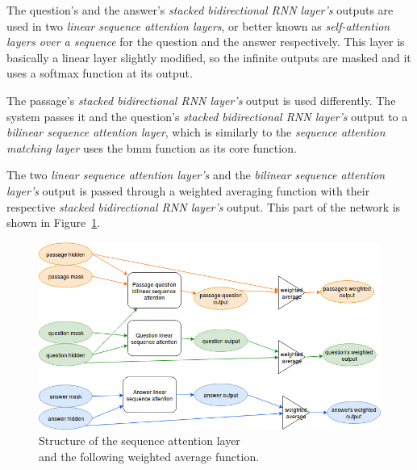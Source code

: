 The question's and the answer's \textit{stacked bidirectional RNN layer's} outputs are used in two \textit{linear sequence attention layers}, or better known as \textit{self-attention layers over a sequence} for the question and the answer respectively. This layer is basically a linear layer slightly modified, so the infinite outputs are masked and it uses a softmax function at its output.

The passage's \textit{stacked bidirectional RNN layer's} output is used differently. The system passes it and the question's \textit{stacked bidirectional RNN layer's} output to a \textit{bilinear sequence attention layer}, which is similarly to the \textit{sequence attention matching layer} uses the bmm function as its core function.

The two \textit{linear sequence attention layer's} and the \textit{bilinear sequence attention layer's} output is passed through a weighted averaging function with their respective \textit{stacked bidirectional RNN layer's} output. This part of the network is shown in Figure~\ref{fig:sequence_attention}.
\begin{figure}[h!]
	\centering
	\includegraphics[scale=0.5]{TriAN_sequence_attention.jpg}
	\caption{Structure of the sequence attention layer\\and the following weighted average function.}
	\label{fig:sequence_attention}
\end{figure}


